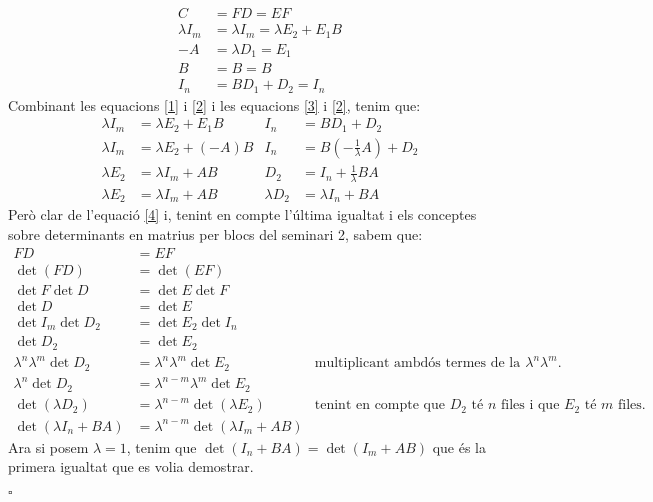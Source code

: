 \documentclass[11pt,a4paper]{article}
\newcommand*{\QED}{\hfill\ensuremath{\square}}
\begin{document}
\begin{enumerate}
\begin{align}
       C&=FD=EF \label{4}\\
       \lambda I_m&=\lambda I_m=\lambda E_2+E_1B \label{1}\\
       -A&=\lambda D_1=E_1 \label{2}\\
       B&=B=B \\
       I_n&=BD_1+D_2=I_n \label{3}
   \end{align}
   Combinant les equacions \ref{1} i \ref{2} i les equacions \ref{3} i \ref{2}, tenim que:
   \begin{align*}
       \lambda I_m&=\lambda E_2+E_1B &I_n&=BD_1+D_2 \\
       \lambda I_m&=\lambda E_2+(-A)B &I_n&=B(-\frac{1}{\lambda}A)+D_2 \\
       \lambda E_2&=\lambda I_m+AB &D_2&=I_n+\frac{1}{\lambda}BA \\
       \lambda E_2&=\lambda I_m+AB &\lambda D_2&=\lambda I_n+BA
   \end{align*}
   Però clar de l'equació \ref{4} i, tenint en compte l'última igualtat i els conceptes sobre determinants en matrius per blocs del seminari 2, sabem que:
   \begin{align*}
       FD&=EF \\
       \det (FD)&=\det (EF) \\
       \det F \det D&=\det E \det F \\
       \det D&=\det E \\
       \det I_m \det D_2&=\det E_2 \det I_n \\
       \det D_2&=\det E_2 \\
       \lambda^n\lambda^m\det D_2&=\lambda^n\lambda^m\det E_2 &\text{multiplicant ambdós termes de la igualtat per  $\lambda^n\lambda^m$.}\\
       \lambda^n\det D_2&=\lambda^{n-m}\lambda^m\det E_2 \\
       \det (\lambda D_2)&=\lambda^{n-m}\det (\lambda E_2) &\text{tenint en compte que $D_2$ té $n$ files i que $E_2$ té $m$ files.}\\
       \det (\lambda I_n+BA)&=\lambda^{n-m}\det (\lambda I_m+AB)
   \end{align*}
    Ara si posem $\lambda=1$, tenim que $\det ( I_n+BA)=\det (I_m+AB)$ que és la primera igualtat que es volia demostrar.\par\QED
    
    
    

\end{enumerate}
\end{document}
